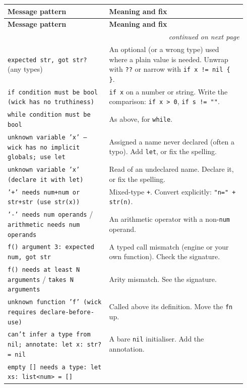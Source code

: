 \begingroup
\small
\begin{longtable}{@{}p{0.40\linewidth}p{0.54\linewidth}@{}}
\toprule
\textbf{Message pattern} & \textbf{Meaning and fix} \\
\midrule
\endfirsthead
\toprule
\textbf{Message pattern} & \textbf{Meaning and fix} \\
\midrule
\endhead
\midrule
\multicolumn{2}{r}{\emph{continued on next page}} \\
\endfoot
\bottomrule
\endlastfoot

\texttt{expected str, got str?} (any types) &
An optional (or a wrong type) used where a plain value is needed. Unwrap with
\texttt{??} or narrow with \texttt{if x != nil \{ \}}. \\
\addlinespace
\texttt{if condition must be bool (wick has no truthiness)} &
\texttt{if x} on a number or string. Write the comparison: \texttt{if x > 0},
\texttt{if s != ""}. \\
\addlinespace
\texttt{while condition must be bool} &
As above, for \texttt{while}. \\
\addlinespace
\texttt{unknown variable 'x' --- wick has no implicit globals; use let} &
Assigned a name never declared (often a typo). Add \texttt{let}, or fix the
spelling. \\
\addlinespace
\texttt{unknown variable 'x' (declare it with let)} &
Read of an undeclared name. Declare it, or fix the spelling. \\
\addlinespace
\texttt{'+' needs num+num or str+str (use str(x))} &
Mixed-type \texttt{+}. Convert explicitly: \texttt{"n=" + str(n)}. \\
\addlinespace
\texttt{'-' needs num operands} / \texttt{arithmetic needs num operands} &
An arithmetic operator with a non-\texttt{num} operand. \\
\addlinespace
\texttt{f() argument 3: expected num, got str} &
A typed call mismatch (engine or your own function). Check the signature. \\
\addlinespace
\texttt{f() needs at least N arguments} / \texttt{takes N arguments} &
Arity mismatch. See the signature. \\
\addlinespace
\texttt{unknown function 'f' (wick requires declare-before-use)} &
Called above its definition. Move the \texttt{fn} up. \\
\addlinespace
\texttt{can't infer a type from nil; annotate: let x: str? = nil} &
A bare \texttt{nil} initialiser. Add the annotation. \\
\addlinespace
\texttt{empty [] needs a type: let xs: list<num> = []} &

\end{longtable}
